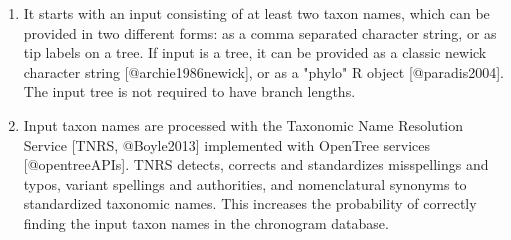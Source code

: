 \documentclass[
  english,
  man]{apa6}
\begin{document}
\begin{enumerate}
\item It starts with an input consisting of at least two taxon names, which can be provided in two different forms: as a comma separated character string, or as tip labels on a tree. If input is a tree, it can be provided as a classic newick character string [@archie1986newick], or as a "phylo" R object [@paradis2004]. The input tree is not required to have branch lengths.
\item Input taxon names are processed with the Taxonomic Name Resolution Service [TNRS, @Boyle2013] implemented with OpenTree services [@opentreeAPIs]. TNRS detects, corrects and standardizes misspellings and typos, variant spellings and authorities,
and nomenclatural synonyms to standardized taxonomic names. This increases the probability of correctly finding the input taxon names in the chronogram database.


\end{enumerate}
\end{document}

